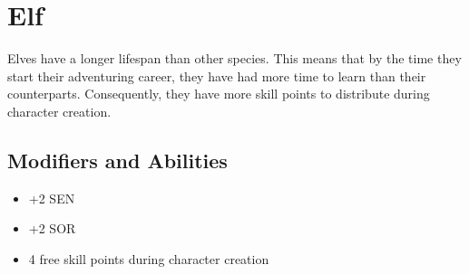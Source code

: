 \section{Elf}\label{elf}
Elves have a longer lifespan than other species. This means that by the time
they start their adventuring career, they have had more time to learn than
their counterparts. Consequently, they have more skill points to distribute
during character creation.

\subsection*{Modifiers and Abilities}
\begin{itemize}
    \item +2 SEN
    \item +2 SOR
    \item 4 free skill points during character creation
\end{itemize}
